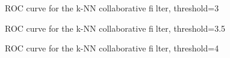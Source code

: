 \documentclass{article}
\begin{document}
\begin{figure}
\centering
{}
\caption{ROC curve for the k-NN collaborative filter, threshold=3} \label{Q15_2}
\end{figure}

\begin{figure}
\centering
{}
\caption{ROC curve for the k-NN collaborative filter, threshold=3.5} \label{Q15_3}
\end{figure}

\begin{figure}
\centering
{}
\caption{ROC curve for the k-NN collaborative filter, threshold=4} \label{Q15_4}
\end{figure}
\end{document}

